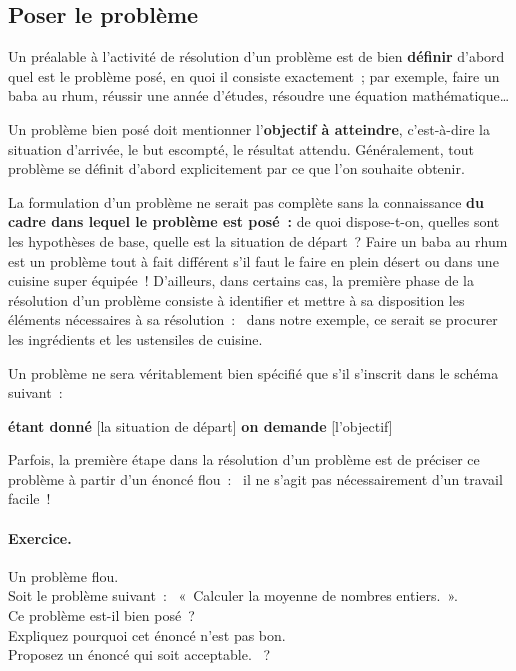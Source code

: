 		\subsection{Poser le problème}
		
			Un préalable à l’activité de résolution d’un problème 
			est de bien \textbf{définir} d’abord 
			quel est le problème posé, 
			en quoi il consiste exactement~; 
			par exemple, faire un baba au rhum, 
			réussir une année d’études, 
			résoudre une équation mathématique\dots
			
			Un problème bien posé doit mentionner 
			l’\textbf{objectif à atteindre},
			c’est-à-dire la situation d’arrivée, 
			le but escompté, le résultat attendu. 
			Généralement, tout problème se définit d’abord explicitement
			par ce que l’on souhaite obtenir.
			
			La formulation d’un problème ne serait pas complète 
			sans la connaissance
			\textbf{du cadre dans lequel le problème est posé~:}
			de quoi dispose-t-on, quelles sont les hypothèses de base, 
			quelle est la situation de départ~? 
			Faire un baba au rhum est un problème tout à fait différent 
			s’il faut le faire en plein désert 
			ou dans une cuisine super équipée~! 
			D’ailleurs, dans certains cas, 
			la première phase de la résolution d’un problème 
			consiste à identifier et mettre à sa disposition 
			les éléments nécessaires à sa résolution~:~
			dans notre exemple, 
			ce serait se procurer les ingrédients 
			et les ustensiles de cuisine.
		
			Un problème ne sera véritablement bien spécifié 
			que s’il s’inscrit dans le schéma suivant~:
			
			\begin{center}
			\begin{Ovalbox}
				{\textbf{étant donné} [la situation de départ] 
				\textbf{on demande} [l’objectif]}
			\end{Ovalbox}
			\end{center}
		
			Parfois, la première étape dans la résolution d’un problème 
			est de préciser ce problème à partir d’un énoncé flou~:~
			il ne s’agit pas nécessairement d’un travail facile~!
	
			\begin{Emphase}
				\paragraph{Exercice.} Un problème flou.\\
				Soit le problème suivant~:~
				«~Calculer la moyenne de nombres entiers.~».\\
				Ce problème est-il bien posé~?\\
				Expliquez pourquoi cet énoncé n'est pas bon. \\
				Proposez un énoncé qui soit acceptable.
				~?
			\end{Emphase}
			
